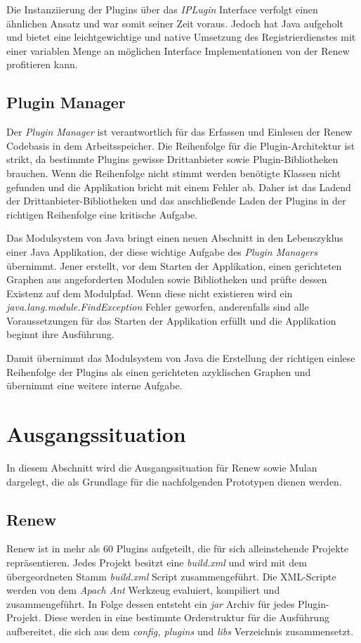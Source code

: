 	Die Instanziierung der Plugins über das \textit{IPLugin} Interface verfolgt einen ähnlichen Ansatz und war somit seiner Zeit voraus. Jedoch hat Java aufgeholt und bietet eine leichtgewichtige und native Umsetzung des Registrierdienstes mit einer variablen Menge an möglichen Interface Implementationen von der Renew profitieren kann.   

\subsection{Plugin Manager}
	Der \textit{Plugin Manager} ist verantwortlich für das Erfassen und Einlesen der Renew Codebasis in dem Arbeitsspeicher. Die Reihenfolge für die Plugin-Architektur ist strikt, da bestimmte Plugins gewisse Drittanbieter sowie Plugin-Bibliotheken brauchen. Wenn die Reihenfolge nicht stimmt werden benötigte Klassen nicht gefunden und die Applikation bricht mit einem Fehler ab. Daher ist das Ladend der Drittanbieter-Bibliotheken und das anschließende Laden der Plugins in der richtigen Reihenfolge eine kritische Aufgabe. \bigbreak

	Das Modulsystem von Java bringt einen neuen Abschnitt in den Lebenszyklus einer Java Applikation, der diese wichtige Aufgabe des \textit{Plugin Managers} übernimmt. Jener erstellt, vor dem Starten der Applikation, einen gerichteten Graphen aus angeforderten Modulen sowie Bibliotheken und prüfte dessen Existenz auf dem Modulpfad. Wenn diese nicht existieren wird ein \textit{java.lang.module.FindException} Fehler geworfen, anderenfalls sind alle Voraussetzungen für das Starten der Applikation erfüllt und die Applikation beginnt ihre Ausführung. \bigbreak

	Damit übernimmt das Modulsystem von Java die Erstellung der richtigen einlese Reihenfolge der Plugins als einen gerichteten azyklischen Graphen und übernimmt eine weitere interne Aufgabe.

\section{Ausgangssituation} \label{sec:ausgangssituation} 
	In diesem Abschnitt wird die Ausgangssituation für Renew sowie Mulan dargelegt, die als Grundlage für die nachfolgenden Prototypen dienen werden. 

\subsection{Renew} \label{sub:renew}
	Renew ist in mehr als 60 Plugins aufgeteilt, die für sich alleinstehende Projekte repräsentieren. Jedes Projekt besitzt eine \textit{build.xml} und wird mit dem übergeordneten Stamm \textit{build.xml} Script zusammengeführt. Die XML-Scripte werden von dem \textit{Apach Ant} Werkzeug evaluiert, kompiliert und zusammengeführt. In Folge dessen entsteht ein \textit{jar} Archiv für jedes Plugin-Projekt. Diese werden in eine bestimmte Orderstruktur für die Ausführung aufbereitet, die sich aus dem \textit{config, plugins} und \textit{libs} Verzeichnis zusammensetzt. \bigbreak

